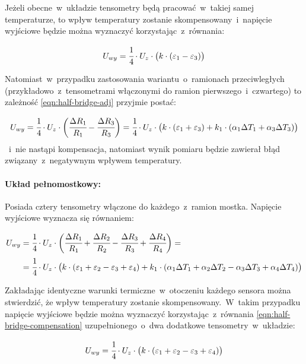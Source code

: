 Jeżeli obecne~w~układzie tensometry będą pracować~w~takiej samej temperaturze, to wpływ temperatury
zostanie skompensowany~i~napięcie wyjściowe będzie można wyznaczyć korzystając~z~równania:

\begin{equation}\label{eqn:half-bridge-compensation}
  U_{wy}=\cfrac{1}{4}\cdot{U_z}\cdot\big({k}\cdot(\varepsilon_1-\varepsilon_3)\big)
\end{equation}

Natomiast~w~przypadku zastosowania wariantu~o~ramionach przeciwległych (przykładowo~z~tensometrami
włączonymi do ramion pierwszego~i~czwartego) to zależność \ref{eqn:half-bridge-adj} przyjmie postać:

\begin{equation}
  U_{wy}=\cfrac{1}{4}\cdot{U_z}\cdot\bigg(\cfrac{\Delta R_1}{R_1}-\cfrac{\Delta R_3}{R_3}\bigg)=
  \cfrac{1}{4}\cdot{U_z}\cdot\big({k}\cdot(\varepsilon_1+\varepsilon_3)+{k_1}\cdot(\alpha_1
  \Delta{T_1}+\alpha_3\Delta{T_3})\big)
\end{equation}
~i~nie nastąpi kompensacja, natomiast wynik pomiaru będzie zawierał błąd związany~z~negatywnym
wpływem temperatury.

\paragraph{Układ pełnomostkowy:} Posiada cztery tensometry włączone do każdego~z~ramion mostka.
Napięcie wyjściowe wyznacza się równaniem:

\begin{align}
  U_{wy} & =\cfrac{1}{4}\cdot{U_z}\cdot\bigg(\cfrac{\Delta R_1}{R_1}+\cfrac{\Delta R_2}{R_2}-
  \cfrac{\Delta R_3}{R_3}+\cfrac{\Delta R_4}{R_4}\bigg)=              \nonumber               \\
         & =\cfrac{1}{4}\cdot{U_z}\cdot\big({k}\cdot
  (\varepsilon_1+\varepsilon_2-\varepsilon_3+\varepsilon_4)+{k_1}\cdot(\alpha_1\Delta{T_1}+
  \alpha_2\Delta{T_2}-\alpha_3\Delta{T_3}+\alpha_4\Delta{T_4})\big)
\end{align}

Zakładając identyczne warunki termiczne~w~otoczeniu każdego sensora można stwierdzić, że wpływ
temperatury zostanie skompensowany.~W~takim przypadku napięcie wyjściowe będzie można wyznaczyć
korzystając~z~równania \ref{eqn:half-bridge-compensation} uzupełnionego~o~dwa dodatkowe
tensometry~w~układzie:

\begin{equation}
  U_{wy}=\cfrac{1}{4}\cdot{U_z}\cdot\big({k}\cdot(\varepsilon_1+\varepsilon_2-\varepsilon_3+
  \varepsilon_4)\big)
\end{equation}

